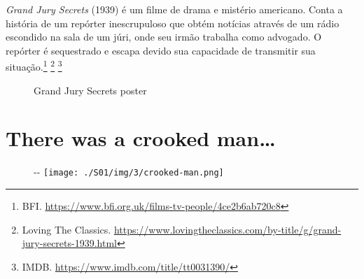 \saveparinfos
\noindent
\begin{minipage}[c]{0.5\textwidth}\useparinfo

\emph{Grand Jury Secrets} (1939) é um filme de drama e mistério
americano. Conta a história de um repórter inescrupuloso que obtém
notícias através de um rádio escondido na sala de um júri, onde seu
irmão trabalha como advogado. O repórter é sequestrado e escapa devido
sua capacidade de transmitir sua situação.\footnote{\sloppy BFI. \url{https://www.bfi.org.uk/films-tv-people/4ce2b6ab720c8}}
\footnote{\sloppy Loving The Classics. \url{https://www.lovingtheclassics.com/by-title/g/grand-jury-secrets-1939.html}}
\footnote{\sloppy IMDB. \url{https://www.imdb.com/title/tt0031390/}}

\end{minipage}\hfill
\begin{minipage}[c]{0.5\textwidth}

\begin{figure}
  \centering
    \caption{Grand Jury Secrets poster\label{fig:grand-jury-secrets-poster}}
\end{figure}

\end{minipage}

\hypertarget{there-was-a-crooked-man}{%
\section{There was a crooked
man\ldots{}}\label{there-was-a-crooked-man}}

\begin{figure}[!ht]
  \begin{adjustwidth}{-\oddsidemargin-1in}{-\rightmargin}
    \centering
    \texttt{[image: ./S01/img/3/crooked-man.png]}
  \end{adjustwidth}
\end{figure}

